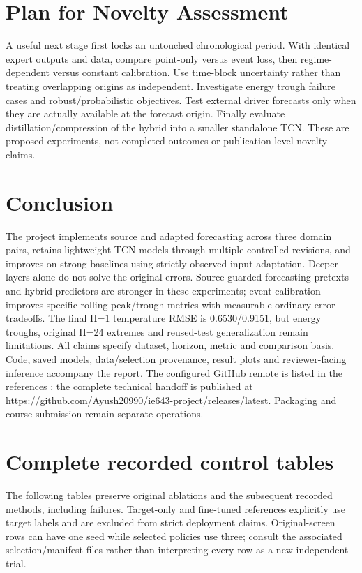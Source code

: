 \section{Plan for Novelty Assessment}\label{sec:Plan for Novelty Assessment}
A useful next stage first locks an untouched chronological period. With identical expert outputs and data, compare point-only versus event loss, then regime-dependent versus constant calibration. Use time-block uncertainty rather than treating overlapping origins as independent. Investigate energy trough failure cases and robust/probabilistic objectives. Test external driver forecasts only when they are actually available at the forecast origin. Finally evaluate distillation/compression of the hybrid into a smaller standalone TCN. These are proposed experiments, not completed outcomes or publication-level novelty claims.

\section{Conclusion}\label{sec:conclusion}
The project implements source and adapted forecasting across three domain pairs, retains lightweight TCN models through multiple controlled revisions, and improves on strong baselines using strictly observed-input adaptation. Deeper layers alone do not solve the original errors. Source-guarded forecasting pretexts and hybrid predictors are stronger in these experiments; event calibration improves specific rolling peak/trough metrics with measurable ordinary-error tradeoffs. The final H=1 temperature RMSE is 0.6530/0.9151, but energy troughs, original H=24 extremes and reused-test generalization remain limitations. All claims specify dataset, horizon, metric and comparison basis. Code, saved models, data/selection provenance, result plots and reviewer-facing inference accompany the report. The configured GitHub remote is listed in the references \citep{Code}; the complete technical handoff is published at \url{https://github.com/Ayush20990/ie643-project/releases/latest}. Packaging and course submission remain separate operations.

\clearpage


\clearpage
\appendix
\section{Complete recorded control tables}
The following tables preserve original ablations and the subsequent recorded methods, including failures. Target-only and fine-tuned references explicitly use target labels and are excluded from strict deployment claims. Original-screen rows can have one seed while selected policies use three; consult the associated selection/manifest files rather than interpreting every row as a new independent trial.



